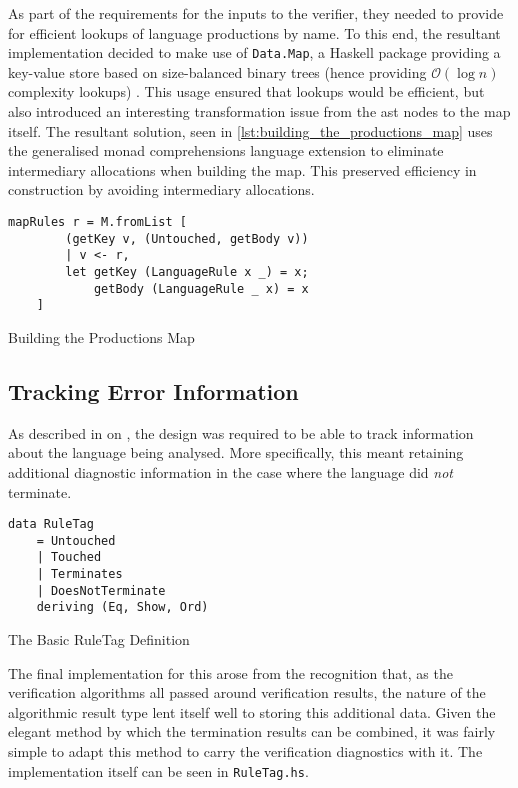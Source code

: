 As part of the requirements for the inputs to the verifier, they needed to provide for efficient lookups of language productions by name. 
To this end, the resultant implementation decided to make use of \texttt{Data.Map}, a Haskell package providing a key-value store based on size-balanced binary trees (hence providing $\mathcal{O}(\log n)$ complexity lookups) \citep{data_map}.
This usage ensured that lookups would be efficient, but also introduced an interesting transformation issue from the \gls{ast} nodes to the map itself.
The resultant solution, seen in \autoref{lst:building_the_productions_map} uses the generalised monad comprehensions language extension to eliminate intermediary allocations when building the map. 
This preserved efficiency in construction by avoiding intermediary allocations.

\begin{listing}[!htb]
\begin{verbatim}
mapRules r = M.fromList [
        (getKey v, (Untouched, getBody v))
        | v <- r,
        let getKey (LanguageRule x _) = x;
            getBody (LanguageRule _ x) = x
    ]
\end{verbatim}
\caption{Building the Productions Map}
\label{lst:building_the_productions_map}
\end{listing} 


\subsection{Tracking Error Information} %
\label{sub:tracking_error_information}
As described in  on , the design was required to be able to track information about the language being analysed.
More specifically, this meant retaining additional diagnostic information in the case where the language did \textit{not} terminate.

\begin{listing}[!htb]
\begin{verbatim}
data RuleTag
    = Untouched
    | Touched
    | Terminates
    | DoesNotTerminate
    deriving (Eq, Show, Ord)
\end{verbatim}
\caption{The Basic RuleTag Definition}
\label{lst:the_basic_ruletag_definition}
\end{listing}

The final implementation for this arose from the recognition that, as the verification algorithms all passed around verification results, the nature of the algorithmic result type lent itself well to storing this additional data. 
Given the elegant method by which the termination results can be combined, it was fairly simple to adapt this method to carry the verification diagnostics with it.
The implementation itself can be seen in \texttt{RuleTag.hs}.

